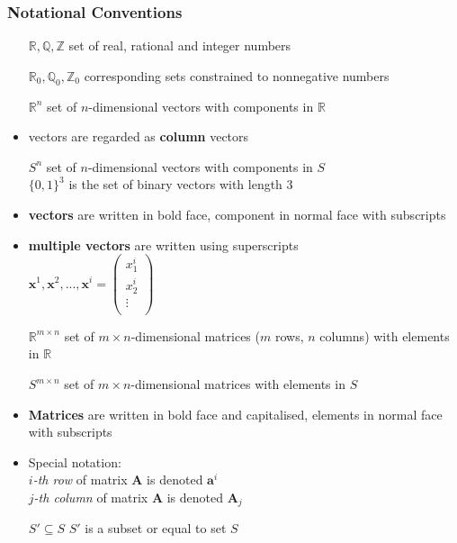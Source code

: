 \documentclass[11pt]{article}
\begin{document}
\subsubsection{Notational Conventions}
\begin{itemize}[label=,leftmargin=*, labelindent=2cm, labelsep=1cm]
	\item[$\mathbb{R}, \mathbb{Q}, \mathbb{Z}$] set of real, rational and integer numbers
	\item[$\mathbb{R}_0, \mathbb{Q}_0, \mathbb{Z}_0$] corresponding sets constrained to nonnegative numbers
	\item[$\mathbb{R}^n$] set of $n$-dimensional vectors with components in $\mathbb{R}$
	\item vectors are regarded as \textbf{column} vectors
	\item[$S^n$] set of $n$-dimensional vectors with components in $S$\\
	$\{0,1\}^3$ is the set of binary vectors with length 3
	\item \textbf{vectors} are written in bold face, component in normal face with subscripts
	\item \textbf{multiple vectors} are written using superscripts\\
	$\textbf{x}^1,\textbf{x}^2,...,\textbf{x}^i = \begin{pmatrix}
		x_1^i\\
		x_2^i\\
		\vdots\\
	\end{pmatrix}$
	\item[$\mathbb{R}^{{m\times n}}$] set of $m\times n$-dimensional matrices ($m$ rows, $n$ columns) with elements in $\mathbb{R}$
	\item[$S^{m\times n}$] set of $m\times n$-dimensional matrices with elements in $S$
	\item \textbf{Matrices} are written in bold face and capitalised, elements in normal face with subscripts
	\item Special notation:\\
	\emph{$i$-th row} of matrix $\textbf{A}$ is denoted $\textbf{a}^{i}$\\
	\emph{$j$-th column} of matrix $\textbf{A}$ is denoted $\textbf{A}_j$
	\item[$S' \subseteq S$] $S'$ is a subset or equal to set $S$
\end{itemize}
\end{document}
